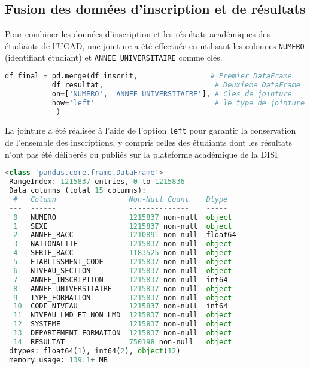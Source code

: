 \subsection{Fusion des données d’inscription et de résultats}

Pour combiner les données d’inscription et les résultats académiques des étudiants de l’UCAD,
 une jointure a été effectuée en utilisant les colonnes \texttt{NUMERO} (identifiant étudiant) et \texttt{ANNEE UNIVERSITAIRE} comme clés.

\begin{lstlisting}[language=Python,
    caption=Jointure des données d’inscription et de résultats,
    label=lst:jointure_ucad,
    basicstyle=\ttfamily\small,
    backgroundcolor=\color{gray!10}
]
 df_final = pd.merge(df_inscrit,                 # Premier DataFrame
           df_resultat,                          # Deuxieme DataFrame
           on=['NUMERO', 'ANNEE UNIVERSITAIRE'], # Cles de jointure
           how='left'                            # le type de jointure
            ) 
\end{lstlisting}

La jointure a été réalisée à l’aide de l’option \texttt{left} pour garantir la conservation de l’ensemble des inscriptions, 
y compris celles des étudiants dont les résultats n’ont pas été délibérés ou publiés sur la plateforme académique de la DISI

\begin{lstlisting}[language=Python,
    caption=Info global du data des inscriptions et résultats, 
    label=lst:inscription_resultat_ucad, 
    basicstyle=\ttfamily\footnotesize, 
    backgroundcolor=\color{gray!10}
]
 <class 'pandas.core.frame.DataFrame'>
 RangeIndex: 1215837 entries, 0 to 1215836
 Data columns (total 15 columns):
  #   Column                 Non-Null Count    Dtype  
 ---  ------                 --------------    -----  
  0   NUMERO                 1215837 non-null  object 
  1   SEXE                   1215837 non-null  object 
  2   ANNEE_BACC             1210891 non-null  float64
  3   NATIONALITE            1215837 non-null  object 
  4   SERIE_BACC             1183525 non-null  object 
  5   ETABLISSMENT_CODE      1215837 non-null  object 
  6   NIVEAU_SECTION         1215837 non-null  object 
  7   ANNEE_INSCRIPTION      1215837 non-null  int64  
  8   ANNEE UNIVERSITAIRE    1215837 non-null  object 
  9   TYPE_FORMATION         1215837 non-null  object 
  10  CODE_NIVEAU            1215837 non-null  int64  
  11  NIVEAU LMD ET NON LMD  1215837 non-null  object 
  12  SYSTEME                1215837 non-null  object 
  13  DEPARTEMENT FORMATION  1215837 non-null  object 
  14  RESULTAT               750198 non-null   object 
 dtypes: float64(1), int64(2), object(12)
 memory usage: 139.1+ MB
\end{lstlisting}

